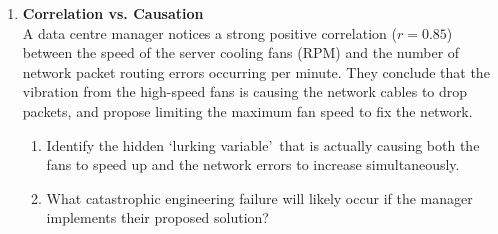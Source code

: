 \begin{enumerate}[label=\textbf{Q\arabic*.}, leftmargin=*, start=4]
    You have a raw dataset of times and voltages. You cannot fit a straight line to this raw data.
    \begin{enumerate}[label=\arabic*.]
        \item How must you transform your raw data table columns (Time and Voltage) before running a linear regression analysis in Python (\texttt{scipy.stats})?
        \item After transforming the data and calculating the line of best fit, Python tells you the gradient (slope) of the line is $-0.2$. What is the RC time constant ($\tau$) of this circuit?
    \end{enumerate}
    \vspace{0.3cm}

    \item \textbf{Correlation vs. Causation} \\
    A data centre manager notices a strong positive correlation ($r = 0.85$) between the speed of the server cooling fans (RPM) and the number of network packet routing errors occurring per minute. They conclude that the vibration from the high-speed fans is causing the network cables to drop packets, and propose limiting the maximum fan speed to fix the network.
    \begin{enumerate}[label=\arabic*.]
        \item Identify the hidden \lq lurking variable\rq\ that is actually causing both the fans to speed up and the network errors to increase simultaneously. 
        \item What catastrophic engineering failure will likely occur if the manager implements their proposed solution?
    \end{enumerate}

\end{enumerate}
